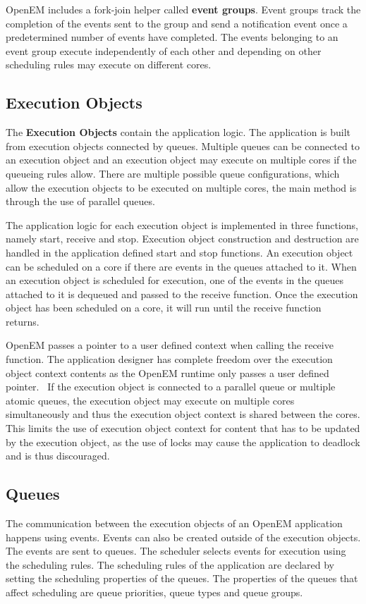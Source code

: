 OpenEM includes a fork-join helper called \textbf{event groups}. Event groups track the completion of the events sent to the group and send a notification event once a predetermined number of events have completed. The events belonging to an event group execute independently of each other and depending on other scheduling rules may execute on different cores. \cite{openemintro}

\subsection{Execution Objects}
\label{subsec:eos}
The \textbf{Execution Objects} contain the application logic. The application is built from execution objects connected by queues. Multiple queues can be connected to an execution object and an execution object may execute on multiple cores if the queueing rules allow. There are multiple possible queue configurations, which allow the execution objects to be executed on multiple cores, the main method is through the use of parallel queues.~\cite{openemintro}

The application logic for each execution object is implemented in three functions, namely start, receive and stop. Execution object construction and destruction are handled in the application defined start and stop functions. An execution object can be scheduled on a core if there are events in the queues attached to it. When an execution object is scheduled for execution, one of the events in the queues attached to it is dequeued and passed to the receive function. Once the execution object has been scheduled on a core, it will run until the receive function returns.~\cite{openemintro}

OpenEM passes a pointer to a user defined context when calling the receive function. The application designer has complete freedom over the execution object context contents as the OpenEM runtime only passes a user defined pointer.~\cite{openemintro} If the execution object is connected to a parallel queue or multiple atomic queues, the execution object may execute on multiple cores simultaneously and thus the execution object context is shared between the cores. This limits the use of execution object context for content that has to be updated by the execution object, as the use of locks may cause the application to deadlock and is thus discouraged.

\subsection{Queues}
\label{subsec:queues}
The communication between the execution objects of an OpenEM application happens using events. Events can also be created outside of the execution objects. The events are sent to queues. The scheduler selects events for execution using the scheduling rules. The scheduling rules of the application are declared by setting the scheduling properties of the queues. The properties of the queues that affect scheduling are queue priorities, queue types and queue groups.~\cite{openemintro}


